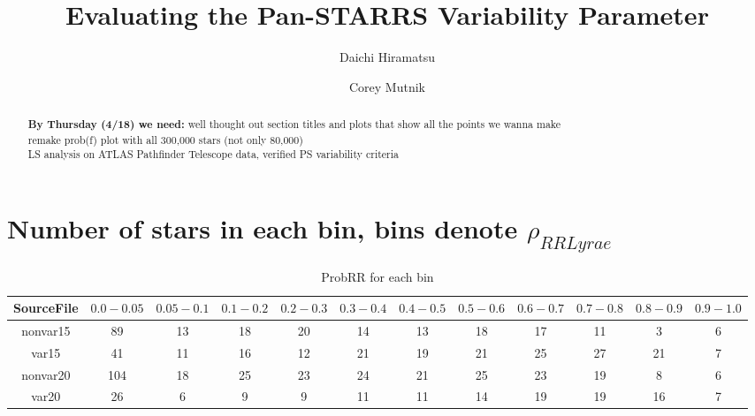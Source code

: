 \documentclass[aps,prb,twocolumn,superscriptaddress]{revtex4-1}
\begin{document}
\title{Evaluating the Pan-STARRS Variability Parameter}


%


\author{Daichi Hiramatsu}
\author{Corey Mutnik}



\begin{abstract}
\textbf{By Thursday (4/18) we need:} well thought out section titles and plots that show all the points we wanna make\\

remake prob(f) plot with all 300,000 stars (not only 80,000)\\

LS analysis on ATLAS Pathfinder Telescope data, verified PS variability criteria
\end{abstract}

\maketitle    



\section{Number of stars in each bin, bins denote $\rho_{RRLyrae}$}

\begin{table*}
	\begin{center}
		\begin{tabular}{| c | c | c | c | c | c | c | c | c | c | c | c |}\hline
			SourceFile & $0.0-0.05$ & $0.05-0.1$ & $0.1-0.2$ & $0.2-0.3$ & $0.3-0.4$ & $0.4-0.5$ & $0.5-0.6$ & $0.6-0.7$ & $0.7-0.8$ & $0.8-0.9$ & $0.9-1.0$ \\ \hline
			nonvar15 & 89 & 13 & 18 & 20 & 14 & 13 & 18 & 17 & 11 & 3 & 6 \\ \hline
			var15 & 41 & 11 & 16 & 12 & 21 & 19 & 21 & 25 & 27 & 21 & 7 \\ \hline
			nonvar20 & 104 & 18 & 25 & 23 & 24 & 21 & 25 & 23 & 19 & 8 & 6 \\ \hline
			var20 & 26 & 6 & 9 & 9 & 11 & 11 & 14 & 19 & 19 & 16 & 7 \\ \hline
		\end{tabular}
	\end{center}
\caption{ \small{ProbRR for each bin\label{tab:probbRRbin}}}
\end{table*}
\end{document}
